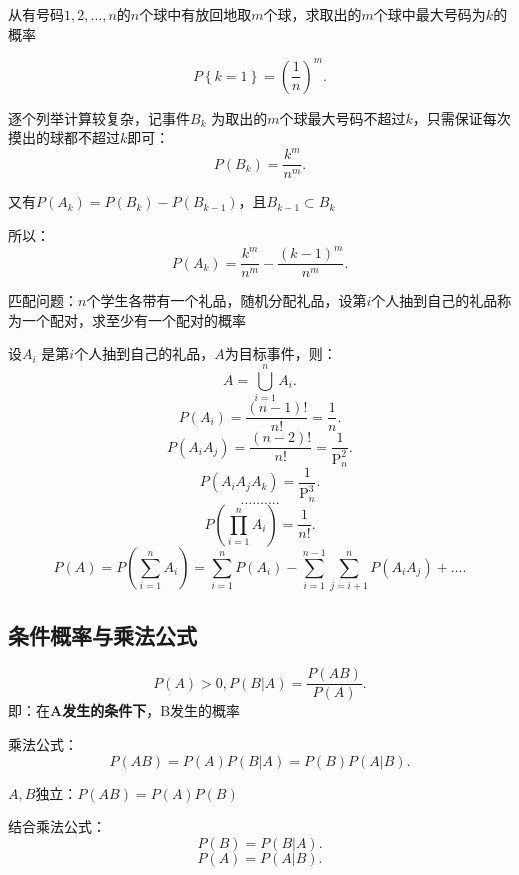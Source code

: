 \begin{eg}
    从有号码$1,2,\ldots,n$的$n$个球中有放回地取$m$个球，求取出的$m$个球中最大号码为$k$的概率

    \[
        P\left\{ k=1 \right\} =\left( \frac{1}{n} \right) ^m
    .\]  

    逐个列举计算较复杂，记事件$B_k$ 为取出的$m$个球最大号码不超过$k$，只需保证每次摸出的球都不超过$k$即可：
    \[
        P\left( B_{k} \right) =\frac{k^m}{n^m}
    .\] 

    又有$P\left( A_{k} \right) =P\left( B_{k} \right) -P\left( B_{k-1} \right) $，且$B_{k-1}\subset B_{k}$ 

    所以：\[
        P\left( A_k \right) =\frac{k^m}{n^m}-\frac{\left( k-1 \right) ^m}{n^m}
    .\] 
\end{eg}
 
\begin{eg}
    匹配问题：$n$个学生各带有一个礼品，随机分配礼品，设第$i$个人抽到自己的礼品称为一个配对，求至少有一个配对的概率

    设$A_{i}$ 是第$i$个人抽到自己的礼品，$A$为目标事件，则： \[
        A=\bigcup_{i=1}^{n}A_{i}
    .\] 
    \[
        P\left( A_{i} \right) =\frac{\left( n-1 \right) !}{n!}=\frac{1}{n}
    .\] 
    \[
        P\left( A_iA_j \right) =\frac{\left( n-2 \right) !}{n!}=\frac{1}{\mathrm{P}_{n}^{2}}
    .\] 
    \[
        P\left( A_iA_jA_k \right) =\frac{1}{\mathrm{P}_{n}^{3}}
    .\] 
    \[
        \ldots\ldots\ldots
    .\] 
    \[
        P\left( \prod_{i=1}^{n} A_i  \right) =\frac{1}{n!}
    .\] 
    \[
        P\left( A \right) =P\left( \sum_{i=1}^{n} A_{i} \right) = \sum_{i=1}^{n} P\left( A_{i} \right) -\sum_{i=1}^{n-1} \sum_{j=i+1}^{n} P\left( A_iA_j \right) +\ldots
    .\] 
\end{eg}
\subsection{条件概率与乘法公式}%
\label{sub:条件概率与乘法公式}
\begin{defi}
    \[
        P\left( A \right) >0,P\left( B | A \right) =\frac{P\left( AB \right) }{P\left( A \right) }
    .\] 
    即：在\textbf{A发生的条件下}，B发生的概率
\end{defi}
\begin{defi}
    乘法公式：\[
        P\left( AB \right) =P\left( A \right) P\left( B|A \right) =P\left( B \right) P\left( A|B \right) 
    .\] 
\end{defi}
\begin{notation}
    $A,B$独立：$P\left( AB \right) =P\left( A \right) P\left( B \right) $

    结合乘法公式：\[
        P\left( B \right) =P\left( B|A \right) 
    .\] 
    \[
        P\left( A \right) =P\left( A|B \right) 
    .\] 
\end{notation}
